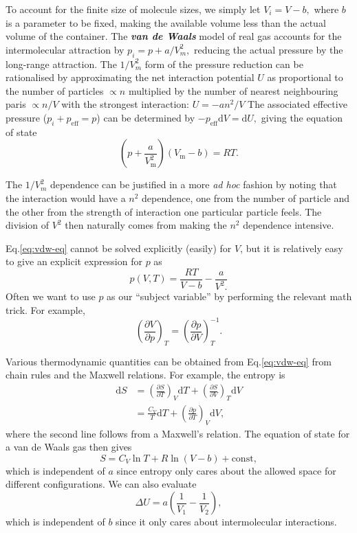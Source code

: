 \documentclass{article}
\theoremstyle{nonumberplain}
\begin{document}
To account for the finite size of molecule sizes, we simply let $V_i = V - b,$ where $b$ is a parameter to be fixed, making the available volume less than the actual volume of the container. The \textit{\textbf{van de Waals}} model of real gas accounts for the intermolecular attraction by $p_i = p + a/V_m^2,$ reducing the actual pressure by the long-range attraction. The $1 / V_m^2$ form of the pressure reduction can be rationalised by approximating the net interaction potential $U$ as proportional to the number of particles $\propto n$ multiplied by the number of nearest neighbouring paris $ \propto n/V$ with the strongest interaction: $U = -a n^2 /V$ The associated effective pressure ($p_i + p_{\mathrm{eff}} = p$) can be determined by $-p_{\mathrm{eff}} \mathrm{d}V = \mathrm{d} U,$ giving the equation of state 
\begin{equation}
    \label{eq:vdw-eq}
    \boxed{
        \left( p + \frac{a}{V_\mathrm{m}^2}\right) (V_\mathrm{m}  - b) = RT.
    }
\end{equation}

The $1/V_m ^{2} $ dependence can be justified in a more \textit{ad hoc} fashion by noting that the interaction would have a $n^2$ dependence, one from the number of particle and the other from the strength of interaction one particular particle feels. The division of $V^2$ then naturally comes from making the $n^2$ dependence intensive. 

Eq.\eqref{eq:vdw-eq} cannot be solved explicitly (easily) for $V$, but it is relatively easy to give an explicit expression for $p$ as 
\[
    p(V,T) = \frac{RT}{V-b} - \frac{a}{V^{2}.}
\]
Often we want to use $p$ as our ``subject variable'' by performing the relevant math trick. For example, 
\[
    \left( \frac{\partial V}{\partial p} \right)_{T} = 
    \left( \frac{\partial p}{\partial V} \right)_{T} ^{-1}.
\]

Various thermodynamic quantities can be obtained from Eq.\eqref{eq:vdw-eq} from chain rules and the Maxwell relations. For example, the entropy is
\[
    \begin{aligned}
        \mathrm{d}S &= \left(\frac{\partial S}{\partial T}  \right)_V \mathrm{d}T + \left(\frac{\partial S}{\partial V}  \right)_T \mathrm{d}V  \\
        &= \frac{C_V}{T}\mathrm{d} T + \left(\frac{\partial p}{\partial T}  \right)_V \mathrm{d}V,
    \end{aligned}
\]
where the second line follows from a Maxwell's relation. The equation of state for a van de Waals gas then gives
\[
    S = C_V \ln T + R \ln (V -b) + \mathrm{const},
\]
which is independent of $a$ since entropy only cares about the allowed space for different configurations. We can also evaluate 
\[
    \Delta U = a \left( \frac{1}{V_1} - \frac{1}{V_2}\right),
\]
which is independent of $b$ since it only cares about intermolecular interactions. 
\end{document}
